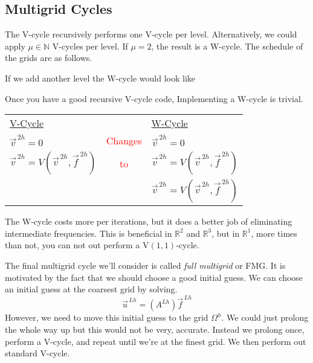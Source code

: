 \subsection{Multigrid Cycles}
The V-cycle recursively performs one V-cycle per level. Alternatively, we could
apply $\mu \in \mathbb{N}$ V-cycles per level. If $\mu=2$, the result is a
W-cycle. The schedule of the grids are as follows. 

\begin{center}
    
\end{center}

If we add another level the W-cycle would look like

\begin{center}
    
\end{center}


Once you have a good recursive V-cycle code, Implementing a W-cycle is trivial.


\begin{center}
\begin{tabular}[t]{lcl}
  \underline{V-Cycle} & & \underline{W-Cycle} \\
  $\vec{v}^{\,2h} = 0$ &\textcolor{red}{Changes} & $\vec{v}^{\,2h} = 0$\\
  $\vec{v}^{\,2h} = V(\vec{v}^{\,2h}, \vec{f}^{\,2h})$ &\textcolor{red}{to}&$\vec{v}^{\,2h} = V(\vec{v}^{\,2h}, \vec{f}^{\,2h})$\\
  &&$\vec{v}^{\,2h} = V(\vec{v}^{\,2h}, \vec{f}^{\,2h})$
\end{tabular}
\end{center}

The W-cycle costs more per iterations, but it does a better job of eliminating
intermediate frequencies. This is beneficial in $\mathbb{R}^2$ and
$\mathbb{R}^3$, but in  $\mathbb{R}^1$, more times than not, you can not out
perform a V$(1, 1)$-cycle.

The final multigrid cycle we'll consider is called \emph{full multigrid} or FMG. It is
motivated by the fact that we should choose a good initial guess. We can choose
an initial guess at the coarsest grid by solving.
\begin{equation*}
\vec{u}^{\,Lh} = (A^{Lh}) \vec{f}^{\,Lh} 
\end{equation*}
However, we need to move this initial guess to the grid $\Omega^h$. We could
just prolong the whole way up but this would not be very, accurate. Instead we
prolong once, perform a V-cycle, and repeat until we're at the finest grid. We
then perform out standard V-cycle.

